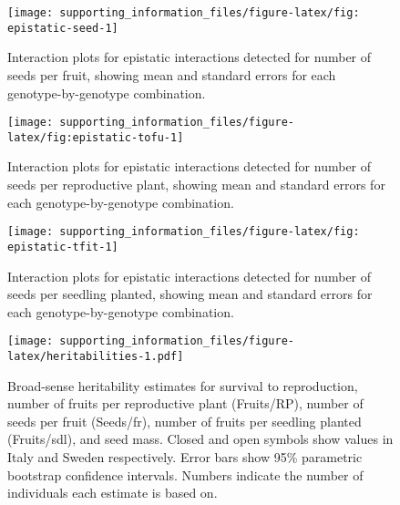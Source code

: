 \documentclass[]{article}
\begin{document}
\newpage

\begin{figure}

{\centering \texttt{[image: supporting\_information\_files/figure-latex/fig: epistatic-seed-1]} 

}

\caption[Epistatic interactions for number of seeds per fruit]{Interaction plots for epistatic interactions detected for number of seeds per fruit, showing mean and standard errors for each genotype-by-genotype combination.}\label{fig:fig: epistatic-seed}
\end{figure}

\begin{figure}

{\centering \texttt{[image: supporting\_information\_files/figure-latex/fig:epistatic-tofu-1]} 

}

\caption[Epistatic interactions for number of seeds per reproductive plant]{Interaction plots for epistatic interactions detected for number of seeds per reproductive plant, showing mean and standard errors for each genotype-by-genotype combination.}\label{fig:fig:epistatic-tofu}
\end{figure}

\begin{figure}

{\centering \texttt{[image: supporting\_information\_files/figure-latex/fig: epistatic-tfit-1]} 

}

\caption[Epistatic interactions for number of seeds per seedling planted]{Interaction plots for epistatic interactions detected for number of seeds per seedling planted, showing mean and standard errors for each genotype-by-genotype combination.}\label{fig:fig: epistatic-tfit}
\end{figure}

\newpage

\begin{figure}
\centering
\texttt{[image: supporting\_information\_files/figure-latex/heritabilities-1.pdf]}
\caption{Broad-sense heritability estimates for survival to
reproduction, number of fruits per reproductive plant (Fruits/RP),
number of seeds per fruit (Seeds/fr), number of fruits per seedling
planted (Fruits/sdl), and seed mass. Closed and open symbols show values
in Italy and Sweden respectively. Error bars show 95\% parametric
bootstrap confidence intervals. Numbers indicate the number of
individuals each estimate is based on.}
\end{figure}
\end{document}
